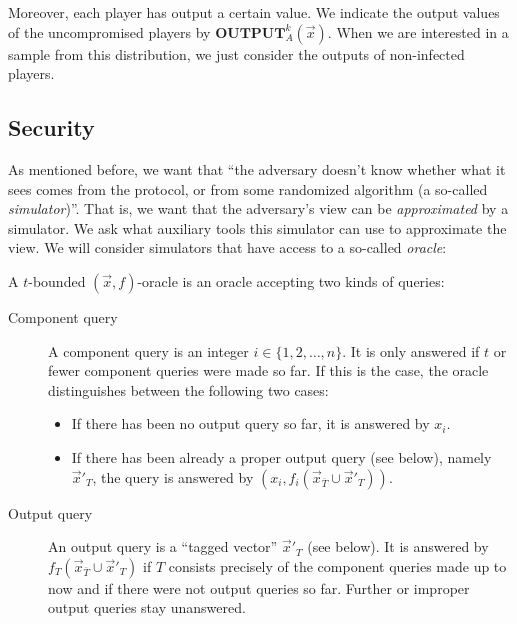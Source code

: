 Moreover, each player has output a certain value. We indicate the output values of the uncompromised players by $\mathbf{OUTPUT}_A^k(\overrightarrow{x})$. When we are interested in a sample from this distribution, we just consider the outputs of non-infected players.

\subsection{Security}
\label{sec:definitions-security}

As mentioned before, we want that ``the adversary doesn't know whether what it sees comes from the protocol, or from some randomized algorithm (a so-called \emph{simulator})''. That is, we want that the adversary's view can be \emph{approximated} by a simulator. We ask what auxiliary tools this simulator can use to approximate the view. We will consider simulators that have access to a so-called \emph{oracle}:

\begin{definition}
  A $t$-bounded $(\overrightarrow{x},f)$-oracle is an oracle accepting two kinds of queries:
  \begin{description}
  \item[Component query] A component query is an integer $i\in \{1,2,\dots,n\}$. It is only answered if $t$ or fewer component queries were made so far. If this is the case, the oracle distinguishes between the following two cases:
    \begin{itemize}
    \item If there has been no output query so far, it is answered by $x_i$.
    \item If there has been already a proper output query (see below), namely $\overrightarrow{x}'_T$, the query is answered by $(x_i,f_i(\overrightarrow{x}_{\overline{T}}\cup\overrightarrow{x}'_{T}))$.
    \end{itemize}
\item[Output query] An output query is a ``tagged vector'' $\overrightarrow{x}'_T$ (see below). It is answered by $f_T(\overrightarrow{x}_{\overline{T}}\cup\overrightarrow{x}'_{T})$ if $T$ consists precisely of the component queries made up to now and if there were not output queries so far. Further or improper output queries stay unanswered.
  \end{description}
\end{definition}

